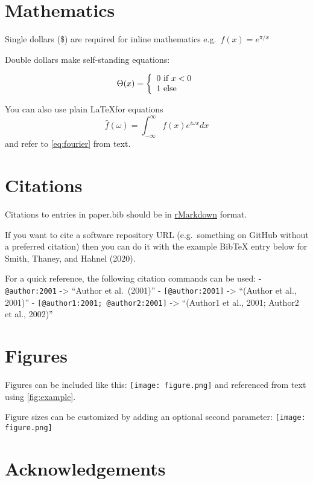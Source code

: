 \documentclass[
]{article}
\begin{document}
\section{Mathematics}\label{mathematics}

Single dollars (\$) are required for inline mathematics
e.g.~\(f(x) = e^{\pi/x}\)

Double dollars make self-standing equations:

\[\Theta(x) = \left\{\begin{array}{l}
0\textrm{ if } x < 0\cr
1\textrm{ else}
\end{array}\right.\]

You can also use plain \LaTeX for equations
\begin{equation}\label{eq:fourier}
\hat f(\omega) = \int_{-\infty}^{\infty} f(x) e^{i\omega x} dx
\end{equation} and refer to \autoref{eq:fourier} from text.

\section{Citations}\label{citations}

Citations to entries in paper.bib should be in
\href{http://rmarkdown.rstudio.com/authoring_bibliographies_and_citations.html}{rMarkdown}
format.

If you want to cite a software repository URL (e.g.~something on GitHub
without a preferred citation) then you can do it with the example BibTeX
entry below for Smith, Thaney, and Hahnel (2020).

For a quick reference, the following citation commands can be used: -
\texttt{@author:2001} -\textgreater{} ``Author et al.~(2001)'' -
\texttt{{[}@author:2001{]}} -\textgreater{} ``(Author et al., 2001)'' -
\texttt{{[}@author1:2001;\ @author2:2001{]}} -\textgreater{} ``(Author1
et al., 2001; Author2 et al., 2002)''

\section{Figures}\label{figures}

Figures can be included like this: \texttt{[image: figure.png]} and
referenced from text using \autoref{fig:example}.

Figure sizes can be customized by adding an optional second parameter:
\texttt{[image: figure.png]}

\section{Acknowledgements}\label{acknowledgements}
\end{document}
